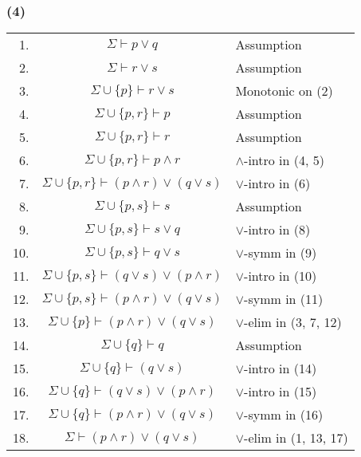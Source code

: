 \documentclass{article}
\begin{document}
\subsubsection*{(4)}
\begin{tabular}{r c l}
    1. & $\Sigma\vdash p\lor q$ & Assumption\\
    2. & $\Sigma\vdash r\lor s$ & Assumption\\
    3. & $\Sigma\cup\{p\}\vdash r\lor s$ & Monotonic on (2)\\
    4. & $\Sigma\cup\{p, r\}\vdash p$ & Assumption\\
    5. & $\Sigma\cup\{p, r\}\vdash r$ & Assumption\\
    6. & $\Sigma\cup\{p, r\}\vdash p\wedge r$ & $\wedge$-intro in (4, 5)\\
    7. & $\Sigma\cup\{p, r\}\vdash (p\wedge r)\lor (q\lor s)$ & $\lor$-intro in (6)\\
    8. & $\Sigma\cup\{p, s\}\vdash s$ & Assumption\\
    9. & $\Sigma\cup\{p, s\}\vdash s\lor q$ & $\lor$-intro in (8)\\
    10. & $\Sigma\cup\{p, s\}\vdash q\lor s$ & $\lor$-symm in (9)\\
    11. & $\Sigma\cup\{p, s\}\vdash (q\lor s)\lor (p\wedge r)$ & $\lor$-intro in (10)\\
    12. & $\Sigma\cup\{p, s\}\vdash (p\wedge r)\lor (q\lor s)$ & $\lor$-symm in (11)\\
    13. & $\Sigma\cup\{p\}\vdash (p\wedge r)\lor (q\lor s)$ & $\lor$-elim in (3, 7, 12)\\
    14. & $\Sigma\cup\{q\}\vdash q$ & Assumption\\
    15. & $\Sigma\cup\{q\}\vdash (q\lor s)$ & $\lor$-intro in (14)\\
    16. & $\Sigma\cup\{q\}\vdash (q\lor s)\lor (p\wedge r)$ & $\lor$-intro in (15)\\
    17. & $\Sigma\cup\{q\}\vdash (p\wedge r)\lor (q\lor s)$ & $\lor$-symm in (16)\\
    18. & $\Sigma\vdash (p\wedge r)\lor (q\lor s)$ & $\lor$-elim in (1, 13, 17)\\
\end{tabular}
\end{document}
